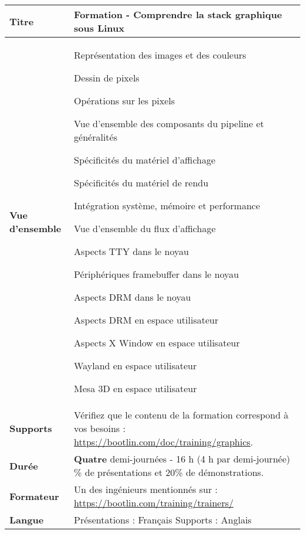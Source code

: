 \documentclass[a4paper,12pt,obeyspaces,spaces,hyphens]{article}
\begin{document}
\feshowtitle

 {
  \begin{tabularx}{\textwidth}{|g|h|}
    {\bf Titre} & {\bf Formation - Comprendre la stack graphique sous Linux} \\
    \hline

    {\bf Vue d'ensemble} &
    Représentation des images et des couleurs \par
    Dessin de pixels \par
    Opérations sur les pixels \par
    Vue d'ensemble des composants du pipeline et généralités \par
    Spécificités du matériel d'affichage \par
    Spécificités du matériel de rendu \par
    Intégration système, mémoire et performance \par
    Vue d'ensemble du flux d'affichage \par
    Aspects TTY dans le noyau \par
    Périphériques framebuffer dans le noyau \par
    Aspects DRM dans le noyau \par
    Aspects DRM en espace utilisateur \par
    Aspects X Window en espace utilisateur \par
    Wayland en espace utilisateur \par
    Mesa 3D en espace utilisateur\\
    \hline
    {\bf Supports} &
    Vérifiez que le contenu de la formation correspond à vos besoins :
    \newline \url{https://bootlin.com/doc/training/graphics}. \\
    \hline

    {\bf Durée} & {\bf Quatre} demi-journées - 16 h (4 h par demi-journée)
    \% de présentations et 20\% de démonstrations. \\
    \hline

    {\bf Formateur} & Un des ingénieurs mentionnés sur :
    \newline \url{https://bootlin.com/training/trainers/}\\
    \hline

    {\bf Langue} & Présentations : Français
    \newline Supports : Anglais\\
    \hline


\end{tabularx}}
\end{document}
